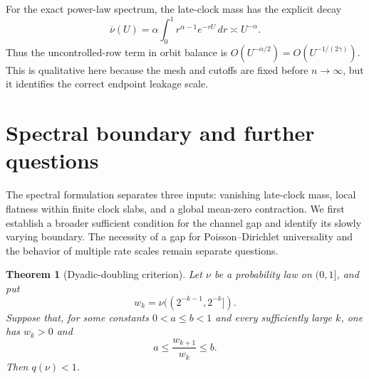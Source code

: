 \documentclass[11pt]{article}
\newtheorem{theorem}{Theorem}[section]
\theoremstyle{definition}
\theoremstyle{remark}
\newcommand{\dd}{\,d}
\begin{document}
For the exact power-law spectrum, the late-clock mass has the explicit decay
\begin{equation}
 \overline\nu(U)
 =\alpha\int_0^1r^{\alpha-1}e^{-rU}\dd r
 \asymp U^{-\alpha}.
 \label{eq:power-tail}
\end{equation}
Thus the uncontrolled-row term in orbit balance is
$O(U^{-\alpha/2})=O(U^{-1/(2\gamma)})$.  This is qualitative here because the
mesh and cutoffs are fixed before $n\to\infty$, but it identifies the correct
endpoint leakage scale.

\section{Spectral boundary and further questions}
\label{sec:boundary}

The spectral formulation separates three inputs: vanishing late-clock mass,
local flatness within finite clock slabs, and a global mean-zero contraction.
We first establish a broader sufficient condition for the channel gap and
identify its slowly varying boundary.  The necessity of a gap for
Poisson--Dirichlet universality and the behavior of multiple rate scales remain
separate questions.

\begin{theorem}[Dyadic-doubling criterion]
\label{thm:dyadic-doubling}
Let $\nu$ be a probability law on $(0,1]$, and put
\[
 w_k=\nu((2^{-k-1},2^{-k}]).
\]
Suppose that, for some constants $0<a\le b<1$ and every sufficiently large
$k$, one has $w_k>0$ and
\[
 a\le\frac{w_{k+1}}{w_k}\le b.
\]
Then $q(\nu)<1$.
\end{theorem}
\end{document}
